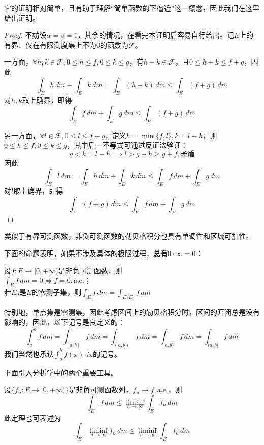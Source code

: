 \documentclass{ctexbook}
\begin{document}
它的证明相对简单，且有助于理解“简单函数的下逼近”这一概念，因此我们在这里给出证明。
\begin{proof}
    不妨设$\alpha=\beta=1$，其余的情况，在看完本证明后容易自行给出。记$E$上的有界、仅在有限测度集上不为0的函数为$\mathcal{F} $。

    一方面，$\forall h,k\in \mathcal{F},0\leq h\leq f,0\leq k\leq g$，有$h+k\in \mathcal{F}$，且$0\leq h+k\leq f+g$，因此
    \[\int_{E}h\,dm+\int_{E}k\,dm=\int_{E}(h+k)\,dm\leq \int_{E}(f+g)\,dm\]
    对$h,k$取上确界，即得
    \[\int_{E}f\,dm+\int_{E}g\,dm\leq \int_{E}(f+g)\,dm\]

    另一方面，$\forall l\in \mathcal{F},0\leq l\leq f+g$，定义$h=\min\{f,l\},k=l-h$，则$0\leq h\leq f,0\leq k\leq g$，其中后一不等式可通过反证法验证：
    \[g<k=l-h\implies l>g+h\geq g+f,\text{矛盾}\]
    因此
    \[\int_{E}l\,dm=\int_{E}h\,dm+\int_{E}k\,dm\leq \int_{E}f\,dm+\int_{E}g\,dm\]
    对$l$取上确界，即得
    \[\int_{E}(f+g)\,dm\leq \int_{E}f\,dm+\int_{E}g\,dm\]
\end{proof}
类似于有界可测函数，非负可测函数的勒贝格积分也具有单调性和区域可加性。

下面的命题表明，如果不涉及具体的极限过程，\textbf{总有$0\cdot\infty=0$}：

\begin{proposition}[$0\cdot\infty=0$]
    设$f:E\to[0,+\infty)$是非负可测函数，则\\
    $\int_{E}f\,dm=0\iff f=0,\text{a.e.}$；\\
    若$E_0$是$E$的零测子集，则$\int_{E}f\,dm=\int_{E\setminus E_0}f\,dm$

\end{proposition}

特别地，单点集是零测集，因此考虑区间上的勒贝格积分时，区间的开闭总是没有影响的，因此，以下记号是良定义的：
\[\int_{a}^{b}f\,dm=\int_{[a,b]}f\,dm=\int_{(a,b)}f\,dm=\int_{[a,b)}f\,dm=\int_{(a,b]}f\,dm\]
我们当然也承认$\int_{a}^{b}f(x)\,dx$的记号。

下面引入分析学中的两个重要工具。
\begin{theorem}[Fatou引理]
    设$\{f_n:E\to[0,+\infty)\}$是非负可测函数列，$f_n\to f,\text{a.e.}$，则
    \[\int_{E}f\,dm\leq \liminf_{n\to\infty}\int_{E}f_n\,dm\]
    此定理也可表述为
    \[\int_{E}\liminf_{n\to\infty}f_n\,dm\leq \liminf_{n\to\infty}\int_{E}f_n\,dm\]
\end{theorem}
\end{document}
